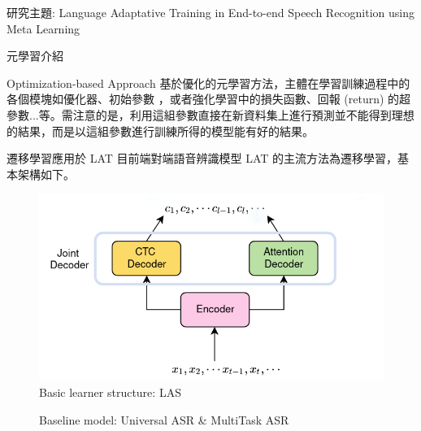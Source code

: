 \documentclass[12pt,UTF8,fntef]{article}
\begin{document}
\begin{section}{研究主題: Language Adaptative Training in End-to-end Speech Recognition using Meta Learning}
\begin{subsection}{元學習介紹}
    \begin{subsubsection}{Optimization-based Approach} \label{opt-meta}
基於優化的元學習方法，主體在學習訓練過程中的各個模塊如優化器\cite{ravi2016optimization}、初始參數\cite{nichol2018first, finn2017model,flennerhag2018transferring} ，或者強化學習中的損失函數、回報 (return) 的超參數...等。需注意的是，利用這組參數直接在新資料集上進行預測並不能得到理想的結果，而是以這組參數進行訓練所得的模型能有好的結果。
    \end{subsubsection}
  \end{subsection}

  \begin{subsection}{遷移學習應用於 LAT} \label{trans-asr}
    目前端對端語音辨識模型 LAT 的主流方法為遷移學習，基本架構如下。

  \begin{figure}[ht]
      \centering
      \includegraphics[width=0.6\linewidth]{monoASR.png}
      \caption{Basic learner structure: LAS}
      \label{fig:monoASR}
  \end{figure}

  \vspace{-0.2in}

  \begin{figure}[ht]
    \centering
    \caption{Baseline model: Universal ASR \& MultiTask ASR}
  \end{figure}


\end{subsection}
\end{section}
\end{document}
